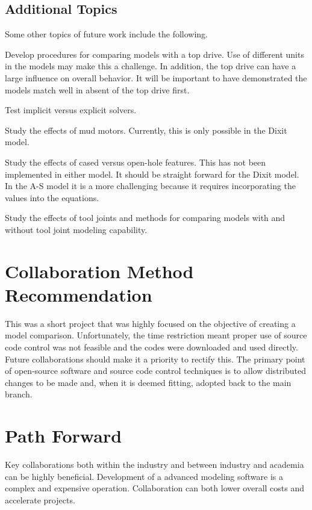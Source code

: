 \subsection{Additional Topics}
Some other topics of future work include the following.
\begin{bulletedlist}
    \item Develop procedures for comparing models with a top drive.  Use of different units in the models may make this a challenge.  In addition, the top drive can have a large influence on overall behavior.  It will be important to have demonstrated the models match well in absent of the top drive first.
	\item Test implicit versus explicit solvers.
	\item Study the effects of mud motors.  Currently, this is only possible in the Dixit model.
    \item Study the effects of cased versus open-hole features.  This has not been implemented in either model.  It should be straight forward for the Dixit model.  In the A-S model it is a more challenging because it requires incorporating the values into the equations.
    \item Study the effects of tool joints and methods for comparing models with and without tool joint modeling capability.
\end{bulletedlist}

\section{Collaboration Method Recommendation}
This was a short project that was highly focused on the objective of creating a model comparison.  Unfortunately, the time restriction meant proper use of source code control was not feasible and the codes were downloaded and used directly.  Future collaborations should make it a priority to rectify this.  The primary point of open-source software and source code control techniques is to allow distributed changes to be made and, when it is deemed fitting, adopted back to the main branch.

\section{Path Forward}
Key collaborations both within the industry and between industry and academia can be highly beneficial.  Development of a advanced modeling software is a complex and expensive operation.  Collaboration can both lower overall costs and accelerate projects.

